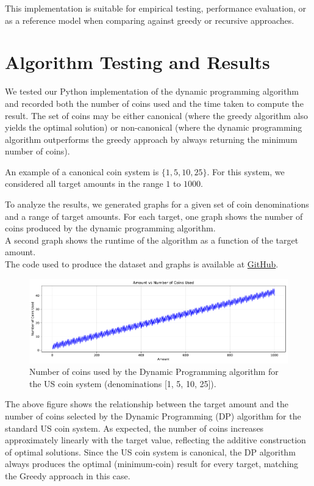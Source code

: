 \documentclass[12pt,a4paper]{report}
\begin{document}
This implementation is suitable for empirical testing, performance evaluation, or as a reference model when comparing against greedy or recursive approaches.


\section{Algorithm Testing and Results}

We tested our Python implementation of the dynamic programming algorithm and recorded both 
the number of coins used and the time taken to compute the result. The set of 
coins may be either canonical (where the greedy algorithm also yields the 
optimal solution) or non-canonical (where the dynamic programming algorithm 
outperforms the greedy approach by always returning the minimum number of coins).

An example of a canonical coin system is 
\(\{1, 5, 10, 25\}\). For this system, we considered all target amounts in the 
range \(1\) to \(1000\).

To analyze the results, we generated graphs for a given set of coin denominations and a range of target amounts. 
For each target, one graph shows the number of coins produced by the dynamic programming algorithm.\\
A second graph shows the runtime of the algorithm as a function of the target amount. \\
The code used to produce the dataset and graphs is available at \href{}{GitHub}. %

\begin{figure}[H]
  \centering
  \includegraphics[width=\textwidth]{graphs/dp_coins_standard_plot.pdf}
  \caption{Number of coins used by the Dynamic Programming algorithm for the US coin system (denominations [1, 5, 10, 25]).}
  \label{fig:dp_coins_standard_plot}
\end{figure}

The above figure shows the relationship between the target amount and the number of coins selected by the Dynamic Programming (DP) algorithm for the standard US coin system. As expected, the number of coins increases approximately linearly with the target value, reflecting the additive construction of optimal solutions. Since the US coin system is canonical, the DP algorithm always produces the optimal (minimum-coin) result for every target, matching the Greedy approach in this case.
\end{document}

